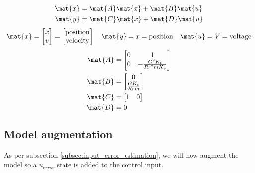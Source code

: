 \begin{theorem}
  \begin{align*}
    \dot{\mat{x}} &= \mat{A} \mat{x} + \mat{B} \mat{u} \\
    \mat{y} &= \mat{C} \mat{x} + \mat{D} \mat{u}
  \end{align*}
  \begin{equation*}
    \mat{x} =
    \begin{bmatrix}
      x \\
      v
    \end{bmatrix} =
    \begin{bmatrix}
      \text{position} \\
      \text{velocity}
    \end{bmatrix}
    \quad
    \mat{y} = x = \text{position}
    \quad
    \mat{u} = V = \text{voltage}
  \end{equation*}
  \begin{align}
    \mat{A} &=
    \begin{bmatrix}
      0 & 1 \\
      0 & -\frac{G^2 K_t}{Rr^2 mK_v}
    \end{bmatrix} \\
    \mat{B} &=
    \begin{bmatrix}
      0 \\
      \frac{GK_t}{Rrm}
    \end{bmatrix} \\
    \mat{C} &=
    \begin{bmatrix}
      1 & 0
    \end{bmatrix} \\
    \mat{D} &= 0
  \end{align}
\end{theorem}

\subsection{Model augmentation}

As per subsection \ref{subsec:input_error_estimation}, we will now augment the
\gls{model} so a $u_{error}$ state is added to the \gls{control input}.

